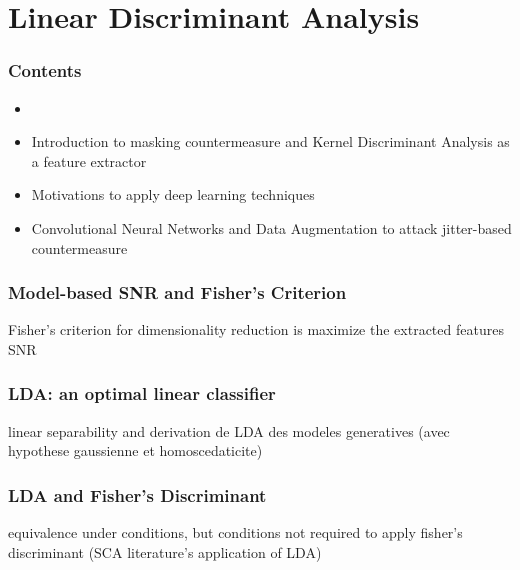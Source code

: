 \section{Linear Discriminant Analysis}

\begin{frame}
\frametitle{Contents}
\begin{itemize}
\item {}
\item Introduction to masking countermeasure and Kernel Discriminant Analysis as a feature extractor
\item Motivations to apply deep learning techniques
\item Convolutional Neural Networks and Data Augmentation to attack jitter-based countermeasure
\end{itemize}
\end{frame}


\begin{frame}
\frametitle{Model-based SNR and Fisher's Criterion}
Fisher's criterion for dimensionality reduction is maximize the extracted features SNR
\end{frame}

\begin{frame}
\frametitle{LDA: an optimal linear classifier}
linear separability and
derivation de LDA des modeles generatives (avec hypothese gaussienne et homoscedaticite)
\end{frame}

\begin{frame}
\frametitle{LDA and Fisher's Discriminant}
equivalence under conditions, but conditions not required to apply fisher's discriminant (SCA literature's application of LDA)
\end{frame}

